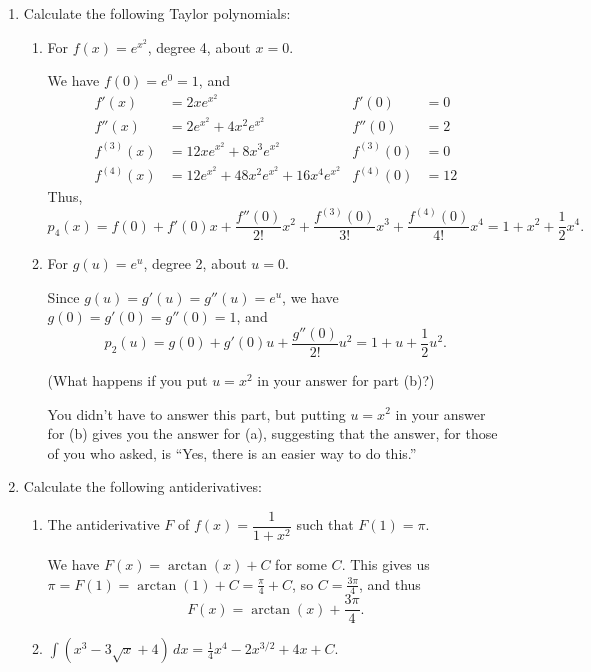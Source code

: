 \documentclass[12pt]{article}
\newcommand{\points}[1]{\marginpar{\hspace{24pt}[#1]}}
\newcommand{\di}{\displaystyle}
\begin{document}
\begin{enumerate}
  \item Calculate the following Taylor polynomials:
  \begin{enumerate}
  \item For $f(x)=e^{x^2}$, degree 4, about $x=0$. \points{4}
  
  We have $f(0)=e^0=1$, and
  \begin{align*}
  f'(x) & = 2xe^{x^2} & f'(0) & = 0\\
  f''(x) &= 2e^{x^2}+4x^2e^{x^2} & f''(0) & = 2\\
  f^{(3)}(x) &= 12xe^{x^2}+8x^3e^{x^2} & f^{(3)}(0) & = 0\\
  f^{(4)}(x) &= 12e^{x^2}+48x^2e^{x^2} + 16x^4e^{x^2} & f^{(4)}(0) & = 12
  \end{align*}
  Thus,
  \[
  p_4(x) = f(0)+f'(0)x+\frac{f''(0)}{2!}x^2+\frac{f^{(3)}(0)}{3!}x^3+\frac{f^{(4)}(0)}{4!}x^4 = 1+x^2+\frac{1}{2}x^4.
  \]
  
  \item For $g(u)=e^u$, degree 2, about $u=0$. \points{2}
  
  Since $g(u)=g'(u)=g''(u)=e^u$, we have $g(0)=g'(0)=g''(0)=1$, and
  \[
  p_2(u) = g(0)+g'(0)u+\frac{g''(0)}{2!}u^2 = 1+u+\frac{1}{2}u^2.
  \]
  
  (What happens if you put $u=x^2$ in your answer for part (b)?)
  
  \medskip
  
  You didn't have to answer this part, but putting $u=x^2$ in your answer for (b) gives you the answer for (a), suggesting that the answer, for those of you who asked, is ``Yes, there is an easier way to do this.''
  
  \end{enumerate}
  \item Calculate the following antiderivatives:
  \begin{enumerate}
  \item The antiderivative $F$ of $f(x) = \dfrac{1}{1+x^2}$ such that $F(1) = \pi$. \points{3}
  
\medskip

We have $F(x) = \arctan(x)+C$ for some $C$. This gives us $\pi = F(1) = \arctan(1)+C=\frac{\pi}{4}+C$, so $C=\frac{3\pi}{4}$, and thus
\[
F(x) = \arctan(x)+\frac{3\pi}{4}.
\]
  
  \item $\di \int (x^3-3\sqrt{x}+4)\,dx = \frac{1}{4}x^4-2x^{3/2}+4x+C.$\points{3}
\end{enumerate}    
  \newpage
  

\end{enumerate}
\end{document}
